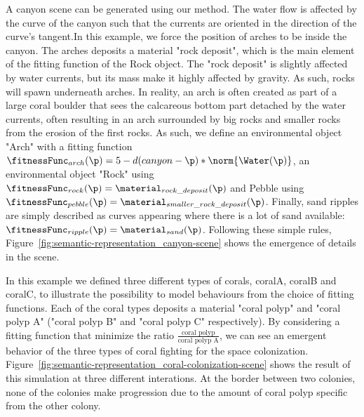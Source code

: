 A canyon scene can be generated using our method. The water flow is affected by the curve of the canyon such that the currents are oriented in the direction of the curve's tangent.In this example, we force the position of arches to be inside the canyon. The arches deposits a material "rock deposit", which is the main element of the fitting function of the Rock object. The "rock deposit" is slightly affected by water currents, but its mass make it highly affected by gravity. As such, rocks will spawn underneath arches. In reality, an arch is often created as part of a large coral boulder that sees the calcareous bottom part detached by the water currents, often resulting in an arch surrounded by big rocks and smaller rocks from the erosion of the first rocks.
As such, we define an environmental object "Arch" with a fitting function $\fitnessFunc_{arch}(\p) = 5 - d(canyon - \p) * \norm{\Water(\p)}$, an environmental object "Rock" using $\fitnessFunc_{rock}(\p) = \material_{rock\_deposit}(\p)$ and Pebble using $\fitnessFunc_{pebble}(\p) = \material_{smaller\_rock\_deposit}(\p)$. Finally, sand ripples are simply described as curves appearing where there is a lot of sand available: $\fitnessFunc_{ripple}(\p) = \material_{sand}(\p)$.
Following these simple rules, Figure~\ref{fig:semantic-representation_canyon-scene} shows the emergence of details in the scene. 

In this example we defined three different types of corals, coralA, coralB and coralC, to illustrate the possibility to model behaviours from the choice of fitting functions. Each of the coral types deposits a material "coral polyp" and "coral polyp A" ("coral polyp B" and "coral polyp C" respectively). By considering a fitting function that minimize the ratio $\frac{\text{coral polyp}}{\text{coral polyp A}}$, we can see an emergent behavior of the three types of coral fighting for the space colonization.
Figure~\ref{fig:semantic-representation_coral-colonization-scene} shows the result of this simulation at three different interations. At the border between two colonies, none of the colonies make progression due to the amount of coral polyp specific from the other colony.


